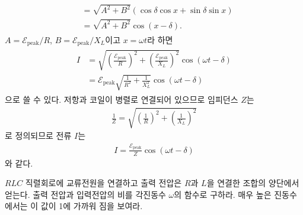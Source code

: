 \documentclass[tightenlines,floatfix,nofootinbib,superscriptaddress,fleqn]{revtex4}
\begin{document}
\begin{itemize}
\begin{align}
\begin{split}
      &=\sqrt{A^2+B^2}(\cos \delta\cos x+\sin \delta\sin x) \\
      &=\sqrt{A^2+B^2}\cos(x-\delta).
    \end{split}
  \end{align}
  $A = \mathcal{E_\mathrm{{peak}}}/R$, $B = \mathcal{E_\mathrm{{peak}}}/X_L$이고
  $x = \omega t$라 하면
  \begin{align}
    \begin{split}
      I &= \sqrt{\left(\frac{\mathcal{E_\mathrm{{peak}}}}{R}\right)^2
      +\left(\frac{\mathcal{E_\mathrm{{peak}}}}{X_L}\right)^2}
      \cos(\omega t-\delta) \\
      &= \mathcal{E_\mathrm{{peak}}}\sqrt{\frac{1}{R^2}+\frac{1}{X_L^2}}
      \cos(\omega t-\delta)
    \end{split}
  \end{align}
  으로 쓸 수 있다. 저항과 코일이 병렬로 연결되어 있으므로 임피던스 $Z$는
  \begin{align}
    \frac{1}{Z} = \sqrt{\left(\frac{1}{R}\right)^2+\left(\frac{1}{X_L}\right)^2}
  \end{align}
  로 정의되므로 전류 $I$는
  \begin{align}
    I = \frac{\mathcal{E_\mathrm{{peak}}}}{Z}\cos(\omega t-\delta)
  \end{align}
  와 같다.
\end{itemize}

\vspace{1cm}

$RLC$ 직렬회로에 교류전원을 연결하고 출력 전압은 $R$과 $L$을 연결한 조합의
양단에서 얻는다. 출력 전압과 입력전압의 비를 각진동수 $\omega$의
함수로 구하라. 매우 높은 진동수에서는 이 값이 1에 가까워 짐을 보여라. 
\end{document}
